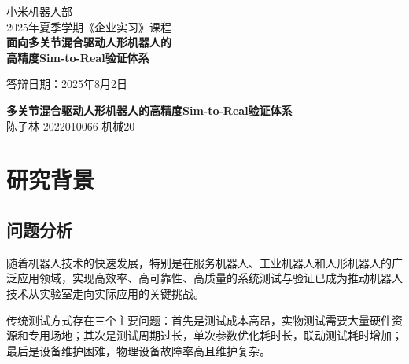 \documentclass[12pt]{article}
\begin{document}
\begin{titlepage}
    \begin{center}
    小米机器人部\\
    2025年夏季学期《企业实习》课程\\
    \vspace{120pt}
    \huge \textbf{面向多关节混合驱动人形机器人的\\高精度Sim-to-Real验证体系}\\
    \vspace{120pt}
    \vspace{24pt}
    
    \begin{table}[H]
        \centering
    \end{table}
    \vspace{60pt}
    \large 答辩日期：2025年8月2日
    \end{center}
\end{titlepage}

\tableofcontents
\newpage

\begin{center}
\Large \textbf{多关节混合驱动人形机器人的高精度Sim-to-Real验证体系}\\
\vspace{10pt}
\small 陈子林 2022010066 机械20
\normalsize
\end{center}

\section{研究背景}
\subsection{问题分析}

随着机器人技术的快速发展，特别是在服务机器人、工业机器人和人形机器人的广泛应用领域，实现高效率、高可靠性、高质量的系统测试与验证已成为推动机器人技术从实验室走向实际应用的关键挑战。

传统测试方式存在三个主要问题：首先是测试成本高昂，实物测试需要大量硬件资源和专用场地；其次是测试周期过长，单次参数优化耗时长，联动测试耗时增加；最后是设备维护困难，物理设备故障率高且维护复杂。
\end{document}
